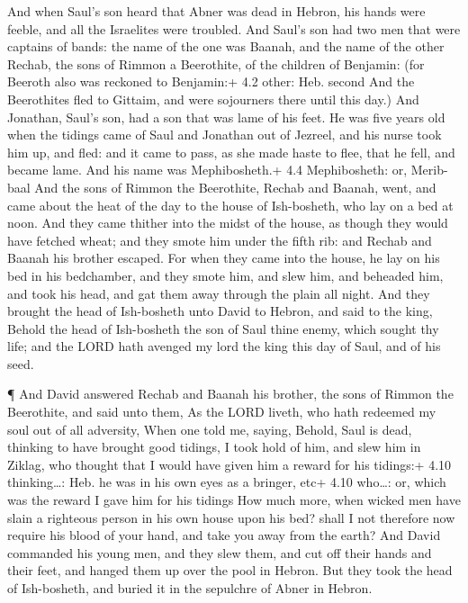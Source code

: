  And when Saul's son heard that Abner was dead in Hebron,
his hands were feeble, and all the Israelites were troubled.
 And Saul's son had two men that were captains of bands: the
name of the one was Baanah, and the name of the other Rechab, the sons
of Rimmon a Beerothite, of the children of Benjamin: (for Beeroth also
was reckoned to Benjamin:+ 4.2 other: Heb. second  And the
Beerothites fled to Gittaim, and were sojourners there until this day.)
 And Jonathan, Saul's son, had a son that was lame of his
feet. He was five years old when the tidings came of Saul and Jonathan
out of Jezreel, and his nurse took him up, and fled: and it came to
pass, as she made haste to flee, that he fell, and became lame. And his
name was Mephibosheth.+ 4.4 Mephibosheth: or, Merib-baal 
And the sons of Rimmon the Beerothite, Rechab and Baanah, went, and came
about the heat of the day to the house of Ish-bosheth, who lay on a bed
at noon.  And they came thither into the midst of the house,
as though they would have fetched wheat; and they smote him under the
fifth rib: and Rechab and Baanah his brother escaped.  For
when they came into the house, he lay on his bed in his bedchamber, and
they smote him, and slew him, and beheaded him, and took his head, and
gat them away through the plain all night.  And they brought
the head of Ish-bosheth unto David to Hebron, and said to the king,
Behold the head of Ish-bosheth the son of Saul thine enemy, which sought
thy life; and the LORD hath avenged my lord the king this day of Saul,
and of his seed.

 ¶ And David answered Rechab and Baanah his brother, the
sons of Rimmon the Beerothite, and said unto them, As the LORD liveth,
who hath redeemed my soul out of all adversity,  When one
told me, saying, Behold, Saul is dead, thinking to have brought good
tidings, I took hold of him, and slew him in Ziklag, who thought that I
would have given him a reward for his tidings:+ 4.10 thinking\ldots:
Heb. he was in his own eyes as a bringer, etc+ 4.10 who\ldots: or, which
was the reward I gave him for his tidings  How much more,
when wicked men have slain a righteous person in his own house upon his
bed? shall I not therefore now require his blood of your hand, and take
you away from the earth?  And David commanded his young
men, and they slew them, and cut off their hands and their feet, and
hanged them up over the pool in Hebron. But they took the head of
Ish-bosheth, and buried it in the sepulchre of Abner in Hebron.

